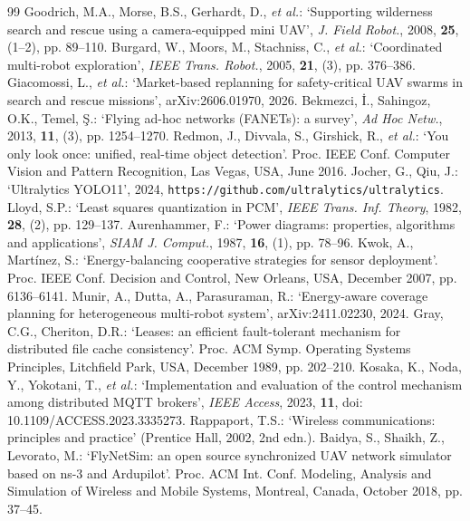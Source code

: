 \begin{thebibliography}{99}
 Goodrich, M.A., Morse, B.S., Gerhardt, D., \textit{et al.}: `Supporting wilderness search and rescue using a camera-equipped mini UAV', \textit{J. Field Robot.}, 2008, \textbf{25}, (1--2), pp. 89--110.
 Burgard, W., Moors, M., Stachniss, C., \textit{et al.}: `Coordinated multi-robot exploration', \textit{IEEE Trans. Robot.}, 2005, \textbf{21}, (3), pp. 376--386.
 Giacomossi, L., \textit{et al.}: `Market-based replanning for safety-critical UAV swarms in search and rescue missions', arXiv:2606.01970, 2026.
 Bekmezci, \.I., Sahingoz, O.K., Temel, \c{S}.: `Flying ad-hoc networks (FANETs): a survey', \textit{Ad Hoc Netw.}, 2013, \textbf{11}, (3), pp. 1254--1270.
 Redmon, J., Divvala, S., Girshick, R., \textit{et al.}: `You only look once: unified, real-time object detection'. Proc. IEEE Conf. Computer Vision and Pattern Recognition, Las Vegas, USA, June 2016.
 Jocher, G., Qiu, J.: `Ultralytics YOLO11', 2024, \nolinkurl{https://github.com/ultralytics/ultralytics}.
 Lloyd, S.P.: `Least squares quantization in PCM', \textit{IEEE Trans. Inf. Theory}, 1982, \textbf{28}, (2), pp. 129--137.
 Aurenhammer, F.: `Power diagrams: properties, algorithms and applications', \textit{SIAM J. Comput.}, 1987, \textbf{16}, (1), pp. 78--96.
 Kwok, A., Mart\'inez, S.: `Energy-balancing cooperative strategies for sensor deployment'. Proc. IEEE Conf. Decision and Control, New Orleans, USA, December 2007, pp. 6136--6141.
 Munir, A., Dutta, A., Parasuraman, R.: `Energy-aware coverage planning for heterogeneous multi-robot system', arXiv:2411.02230, 2024.
 Gray, C.G., Cheriton, D.R.: `Leases: an efficient fault-tolerant mechanism for distributed file cache consistency'. Proc. ACM Symp. Operating Systems Principles, Litchfield Park, USA, December 1989, pp. 202--210.
 Kosaka, K., Noda, Y., Yokotani, T., \textit{et al.}: `Implementation and evaluation of the control mechanism among distributed MQTT brokers', \textit{IEEE Access}, 2023, \textbf{11}, doi: 10.1109/ACCESS.2023.3335273.
 Rappaport, T.S.: `Wireless communications: principles and practice' (Prentice Hall, 2002, 2nd edn.).
 Baidya, S., Shaikh, Z., Levorato, M.: `FlyNetSim: an open source synchronized UAV network simulator based on ns-3 and Ardupilot'. Proc. ACM Int. Conf. Modeling, Analysis and Simulation of Wireless and Mobile Systems, Montreal, Canada, October 2018, pp. 37--45.
\end{thebibliography}
